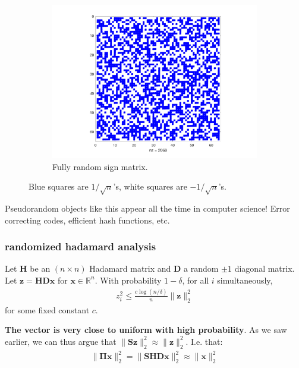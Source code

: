 \documentclass[compress]{beamer}
\newcommand{\bs}[1]{\boldsymbol{#1}}
\newcommand{\bv}[1]{\mathbf{#1}}
\newcommand{\R}{\mathbb{R}}
\begin{document}
\begin{frame}
\begin{figure}[h]
\begin{subfigure}[t]{0.3\textwidth}
		\end{subfigure}
		\begin{subfigure}[t]{0.3\textwidth}
			\centering
			\includegraphics[width=\textwidth]{fullyRandom.png}
			\caption{Fully random sign matrix.}
		\end{subfigure}
	\caption{Blue squares are $1/\sqrt{n}$'s, white squares are $-1/\sqrt{n}$'s.}
	\end{figure}
Pseudorandom objects like this appear all the time in computer science! Error correcting codes, efficient hash functions, etc.
\end{frame}

\begin{frame}[t]
	\frametitle{randomized hadamard analysis}
	\begin{lemma}
		Let $\bv{H}$ be an $(n\times n)$ Hadamard matrix and $\bv{D}$ a random $\pm 1$ diagonal matrix. Let $\bv{z} = \bv{HD}\bv{x}$ for $\bv{x}\in \R^n$. With probability $1-\delta$, for all $i$ simultaneously,
		\begin{align*}
			z_i^2 \leq \frac{c\log(n/\delta)}{n} \|\bv{z}\|_2^2 
		\end{align*}
		for some fixed constant $c$. 
	\end{lemma}
	\alert{\textbf{The vector is very close to uniform with high probability}.} As we saw earlier, we can thus argue that $\|\bv{S}\bv{z}\|_2^2 \approx \|\bv{z}\|_2^2$. I.e. that:
	\begin{align*}
		\|\bs{\Pi}\bv{x}\|_2^2 = \|\bv{SHD}\bv{x}\|_2^2 \approx \|\bv{x}\|_2^2
	\end{align*}
\end{frame}
\end{document}
